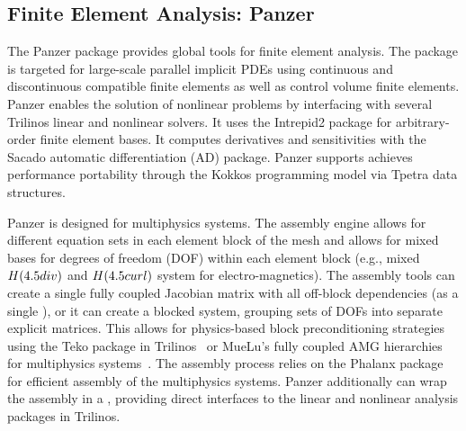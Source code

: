 \subsection{Finite Element Analysis: Panzer}
The Panzer package provides global tools for finite element analysis. The package is targeted for large-scale parallel implicit PDEs using continuous and discontinuous compatible finite elements as well as control volume finite elements. Panzer enables the solution of nonlinear problems by interfacing with several Trilinos linear and nonlinear solvers. It uses the Intrepid2 package for arbitrary-order finite element bases. It computes derivatives and sensitivities with the Sacado automatic differentiation (AD) package. Panzer supports achieves performance portability through the Kokkos programming model via Tpetra data structures.

Panzer is designed for multiphysics systems.
The assembly engine allows for different equation sets in each element block of the mesh and allows for mixed bases for degrees of freedom (DOF) within each element block
(e.g., mixed $H(\rm{div})$ and $H(\rm{curl})$ system for electro-magnetics).
The assembly tools can create a single fully coupled Jacobian matrix with all off-block dependencies (as a single ),
or it can create a blocked system, grouping sets of DOFs into separate explicit matrices.
This allows for physics-based block preconditioning strategies using the Teko package in Trilinos~\cite{Bonilla2023,Cyr2016a}
or MueLu's fully coupled AMG hierarchies for multiphysics systems~\cite{Ohm2022a}.
The assembly process relies on the Phalanx package for efficient assembly of the multiphysics systems.
Panzer additionally can wrap the assembly in a , providing direct interfaces to the linear and nonlinear analysis packages in Trilinos.

